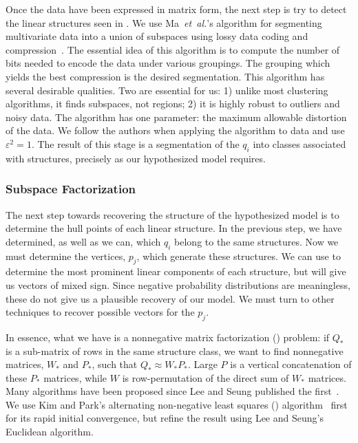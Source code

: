 \documentclass[conference]{IEEEtran}
\begin{document}
Once the data have been expressed in matrix form, the next step is try to detect the linear structures seen in .
We use Ma~\emph{et~al.}'s algorithm for segmenting multivariate data into a union of subspaces using lossy data coding and compression~\cite{Ma07}.
The essential idea of this algorithm is to compute the number of bits needed to encode the data under various groupings.
The grouping which yields the best compression is the desired segmentation.
This algorithm has several desirable qualities.
Two are essential for us:
1) unlike most clustering algorithms, it finds subspaces, not regions;
2) it is highly robust to outliers and noisy data.
The algorithm has one parameter:
the maximum allowable distortion of the data.
We follow the authors when applying the algorithm to  data and use $\varepsilon^2 = 1$.
The result of this stage is a segmentation of the $q_i$ into classes associated with structures, precisely as our hypothesized model requires.

\subsubsection{Subspace Factorization}


The next step towards recovering the structure of the hypothesized model is to determine the hull points of each linear structure.
In the previous step, we have determined, as well as we can, which $q_i$ belong to the same structures.
Now we must determine the vertices, $p_j$, which generate these structures.
We can use  to determine the most prominent linear components of each structure, but  will give us vectors of mixed sign.\svdnnnote
Since negative probability distributions are meaningless, these do not give us a plausible recovery of our model.
We must turn to other techniques to recover possible vectors for the $p_j$.

In essence, what we have is a nonnegative matrix factorization () problem:
if $Q_*$ is a sub-matrix of rows in the same structure class, we want to find nonnegative matrices, $W_*$ and $P_*$, such that $Q_* \approx W_* P_*$.
Large $P$ is a vertical concatenation of these $P_*$ matrices, while $W$ is row-permutation of the direct sum of $W_*$ matrices.
Many  algorithms have been proposed since Lee and Seung published the first~\cite{Lee01}.
We use Kim and Park's alternating non-negative least squares () algorithm~\cite{Kim08:anls} first for its rapid initial convergence, but refine the result using Lee and Seung's Euclidean algorithm.
\end{document}
